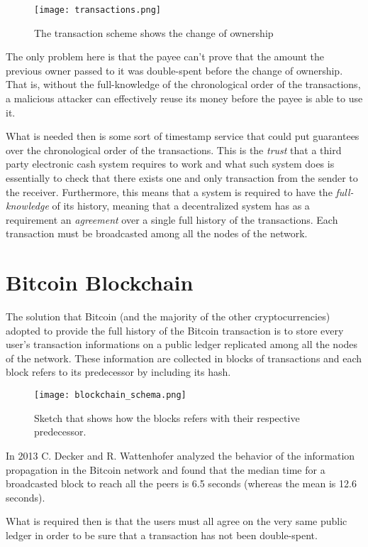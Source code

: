 		\begin{figure}
			\caption{The transaction scheme shows the change of ownership}
			\texttt{[image: transactions.png]}
			\centering	
		\end{figure}
	
		The only problem here is that the payee can't prove that the amount the previous owner passed to it was double-spent before the change of ownership. That is, without the full-knowledge of the chronological order of the transactions, a malicious attacker can effectively reuse its money before the payee is able to use it. 
		
		What is needed then is some sort of timestamp service that could put guarantees over the chronological order of the transactions. This is the \textit{trust} that a third party electronic cash system requires to work and what such system does is essentially to check that there exists one and only transaction from the sender to the receiver. Furthermore, this means that a system is required to have the \textit{full-knowledge} of its history, meaning that a decentralized system has as a requirement an \textit{agreement} over a single full history of the transactions. Each transaction must be broadcasted among all the nodes of the network.
		
	\section{Bitcoin Blockchain}
		The solution that Bitcoin (and the majority of the other cryptocurrencies) adopted to provide the full history of the Bitcoin transaction is to store every user's transaction informations on a public ledger replicated among all the nodes of the network. These information are collected in blocks of transactions and each block refers to its predecessor by including its hash.
		
		\begin{figure}
			\caption{Sketch that shows how the blocks refers with their respective predecessor.}
			\texttt{[image: blockchain\_schema.png]}
			\centering	
		\end{figure}
	
		In 2013 C. Decker and R. Wattenhofer \cite{Decker2013} analyzed the behavior of the information propagation in the Bitcoin network and found that the median time for a broadcasted block to reach all the peers is 6.5 seconds (whereas the mean is 12.6 seconds).
		
		What is required then is that the users must all agree on the very same public ledger in order to be sure that a transaction has not been double-spent.
		
